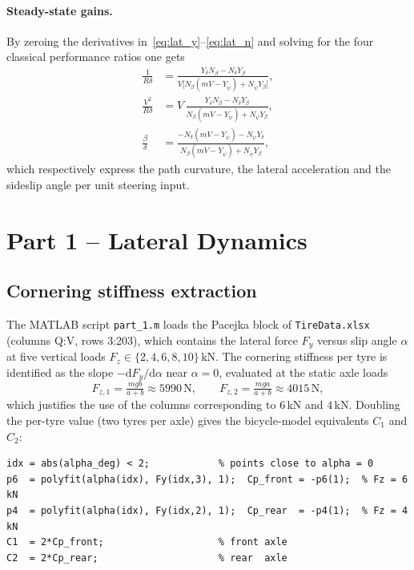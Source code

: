 \paragraph{Steady-state gains.}
By zeroing the derivatives in~\eqref{eq:lat_y}--\eqref{eq:lat_n} and
solving for the four classical performance ratios one gets
\begin{align}
    \frac{1}{R\delta}    &= \frac{Y_\delta N_\beta - N_\delta Y_\beta}
        {V\bigl[N_\beta(mV - Y_{\dot\psi}) + N_{\dot\psi} Y_\beta\bigr]},
        \label{eq:gain_curv}\\[2pt]
    \frac{V^2}{R\delta}  &= V\,\frac{Y_\delta N_\beta - N_\delta Y_\beta}
        {N_\beta(mV - Y_{\dot\psi}) + N_{\dot\psi} Y_\beta},
        \label{eq:gain_ay}\\[2pt]
    \frac{\beta}{\delta} &= \frac{-N_\delta(mV - Y_{\dot\psi}) - N_{\dot\psi} Y_\delta}
        {N_\beta(mV - Y_{\dot\psi}) + N_{\dot\psi} Y_\beta},
        \label{eq:gain_beta}
\end{align}
which respectively express the path curvature, the lateral
acceleration and the sideslip angle per unit steering input.

\section{Part 1 -- Lateral Dynamics}

\subsection{Cornering stiffness extraction}
The MATLAB script \texttt{part\_1.m} loads the Pacejka block of
\texttt{TireData.xlsx} (columns Q:V, rows 3:203), which contains the
lateral force $F_y$ versus slip angle $\alpha$ at five vertical loads
$F_z \in \{2,4,6,8,10\}$\,kN. The cornering stiffness per tyre is
identified as the slope $-\mathrm{d}F_y/\mathrm{d}\alpha$ near
$\alpha = 0$, evaluated at the static axle loads
\begin{equation}
    F_{z,1} = \tfrac{m g b}{a+b} \approx 5990\,\text{N}, \qquad
    F_{z,2} = \tfrac{m g a}{a+b} \approx 4015\,\text{N},
\end{equation}
which justifies the use of the columns corresponding to $6$\,kN and
$4$\,kN. Doubling the per-tyre value (two tyres per axle) gives the
bicycle-model equivalents $C_1$ and $C_2$:
\begin{lstlisting}
idx = abs(alpha_deg) < 2;            % points close to alpha = 0
p6  = polyfit(alpha(idx), Fy(idx,3), 1);  Cp_front = -p6(1);  % Fz = 6 kN
p4  = polyfit(alpha(idx), Fy(idx,2), 1);  Cp_rear  = -p4(1);  % Fz = 4 kN
C1  = 2*Cp_front;                    % front axle
C2  = 2*Cp_rear;                     % rear  axle
\end{lstlisting}

